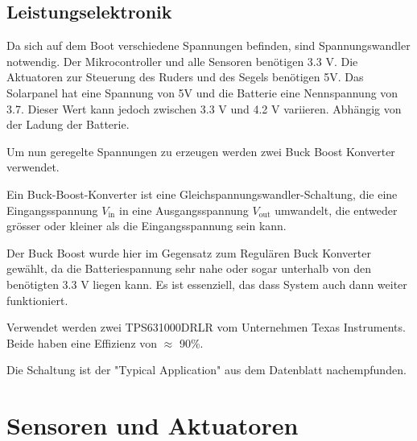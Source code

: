 \subsection{Leistungselektronik}
Da sich auf dem Boot verschiedene Spannungen befinden, sind Spannungswandler notwendig. Der Mikrocontroller und alle Sensoren benötigen 3.3 V. Die Aktuatoren zur Steuerung des Ruders und des Segels benötigen 5V. Das Solarpanel hat eine Spannung von 5V und die Batterie eine Nennspannung von 3.7. Dieser Wert kann jedoch zwischen 3.3 V und 4.2 V variieren. Abhängig von der Ladung der Batterie.

Um nun geregelte Spannungen zu erzeugen werden zwei Buck Boost Konverter verwendet. 

Ein Buck-Boost-Konverter ist eine Gleichspannungswandler-Schaltung, die eine Eingangsspannung \( V_{\text{in}} \) in eine Ausgangsspannung \( V_{\text{out}} \) umwandelt, die entweder grösser oder kleiner als die Eingangsspannung sein kann. 

Der Buck Boost wurde hier im Gegensatz zum Regulären Buck Konverter gewählt, da die Batteriespannung sehr nahe oder sogar unterhalb von den benötigten 3.3 V liegen kann. Es ist essenziell, das dass System auch dann weiter funktioniert.

Verwendet werden zwei TPS631000DRLR vom Unternehmen Texas Instruments. Beide haben eine Effizienz von $\approx$ 90\%.

Die Schaltung ist der "Typical Application" aus dem Datenblatt nachempfunden.
\section{Sensoren und Aktuatoren}
